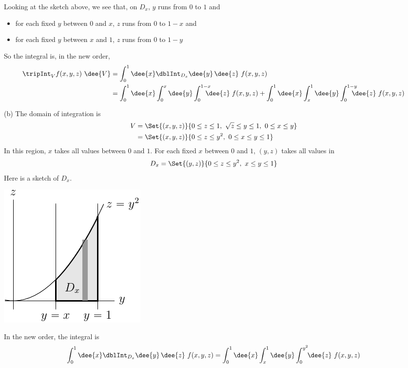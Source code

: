 \begin{solution}
\begin{itemize}
Looking at the sketch above, we see that, on $D_x$, $y$ runs from $0$ to $1$
and
\begin{itemize}
\item
for each fixed $y$ between $0$ and $x$, $z$ runs from $0$ to $1-x$ and
\item
for each fixed $y$ between $x$ and $1$, $z$ runs from $0$ to $1-y$
\end{itemize}
\end{itemize}
So the integral is, in the new order, 
\begin{align*}
\tripInt_V f(x,y,z)\ \dee{V}
&= \int_0^1\dee{x}\dblInt_{D_x} \dee{y}\,\dee{z}\ f(x,y,z) \\
&= \int_0^1\dee{x}\int_0^{x}\dee{y}\int_0^{1-x}\hskip-10pt \dee{z}\hskip3pt f(x,y,z)
+\int_0^1\dee{x}\int_x^{1}\dee{y}\int_0^{1-y}\hskip-10pt \dee{z}\hskip3pt f(x,y,z)
\end{align*}


(b) The domain of integration is 
\begin{align*}
V &= \Set{(x,y,z)}{0\le z\le 1,\ \sqrt{z}\le y\le 1,\ 0\le x\le y} \\
  &= \Set{(x,y,z)}{0\le z\le y^2,\ 0\le x\le y\le 1} 
\end{align*}
In this region, $x$ takes all values between $0$ and $1$. For each fixed
$x$ between $0$ and $1$, $(y,z)$ takes all values in
\begin{equation*}
D_x=\Set{(y,z)}{0\le z\le y^2,\ x\le y\le 1}
\end{equation*}
Here is a sketch of $D_x$.
\begin{center}
     \includegraphics{fig/domainSwitchb.pdf}
\end{center}
In the new order, the integral is
\begin{equation*}
\int_0^1\dee{x}\dblInt_{D_x} \dee{y}\,\dee{z}\ f(x,y,z)
=\int_0^1\dee{x}\int_x^{1}\dee{y}\int_0^{y^2}\!\! \dee{z}\  f(x,y,z)
\end{equation*}
\end{solution}


